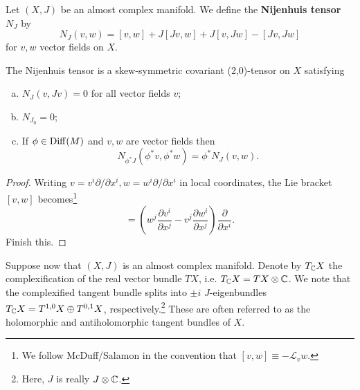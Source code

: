 \documentclass{amsart}
\begin{document}
\begin{definition}
    Let $(X,J)$ be an almost complex manifold. We define the \textbf{Nijenhuis tensor} $N_J$ by
    \begin{equation*}
        N_J(v,w) = [v,w] + J[Jv,w] + J[v,Jw] - [Jv,Jw]
    \end{equation*}
    for $v,w$ vector fields on $X$.
\end{definition}

\begin{lemma}
    The Nijenhuis tensor is a skew-symmetric covariant (2,0)-tensor on $X$ satisfying
    \begin{enumerate}[(a)]
        \item $N_J(v,Jv)=0$ for all vector fields $v$;
        \item $N_{J_0}=0$;
        \item If $\phi\in\operatorname{Diff}(M)$ and $v,w$ are vector fields then
            \begin{equation*}
                N_{\phi^*J}(\phi^*v,\phi^*w) = \phi^*N_J(v,w).
            \end{equation*}
    \end{enumerate}
\end{lemma}
\begin{proof}
    Writing $v=v^i\partial/\partial x^i, w=w^i\partial/\partial x^i$ in local coordinates,
    the Lie bracket $[v,w]$ becomes\footnote{We follow McDuff/Salamon in the convention that
        $[v,w]\equiv-\mathcal{L}_vw$.}
    \begin{equation*}
        [v,w] = \left( w^j\frac{\partial v^i}{\partial x^j} - v^j\frac{\partial w^i}{\partial x^j} \right)\frac{\partial}{\partial x^i}.
    \end{equation*}
    Finish this.
\end{proof}

Suppose now that $(X,J)$ is an almost complex manifold. Denote by $T_{\mathbb{C}} X$ the complexification
of the real vector bundle $TX$, i.e. $T_{\mathbb{C}} X=TX\otimes\mathbb{C}$. We note that the complexified
tangent bundle splits into $\pm i$ $J$-eigenbundles $T_{\mathbb{C}} X = T^{1,0}X\oplus T^{0,1}X$,
respectively.\footnote{Here, $J$ is really $J\otimes\mathbb{C}$.} These are often referred to as the
holomorphic and antiholomorphic tangent bundles of $X$.
\end{document}
